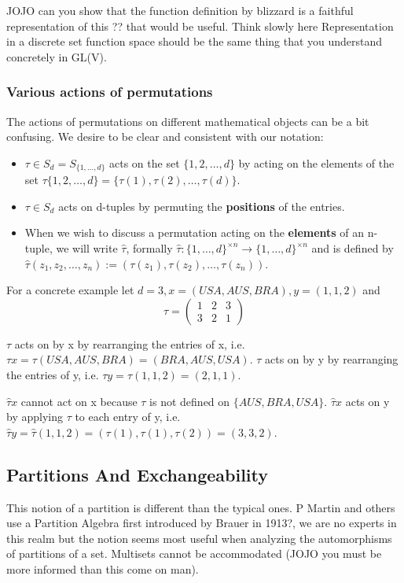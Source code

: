 \documentclass{article}
\theoremstyle{definition}
\begin{document}
JOJO can you show that the function definition by blizzard is a faithful representation of this ?? that would be useful. Think slowly here Representation in a discrete set function space should be the same thing that you understand concretely in GL(V).

\subsubsection{Various actions of permutations}
The actions of permutations on different mathematical objects can be a bit confusing. We desire to be clear and consistent with our notation:
\begin{itemize}
\item $\tau \in S_d= S_{\{1,\dots,d\}}$ acts on the set $\{1,2,\dots,d\}$ by acting on the elements of the set $\tau\{1,2,\dots,d\} = \{\tau(1),\tau(2),\dots,\tau(d)\}$.
\item $\tau\in S_d$ acts on d-tuples by permuting the \textbf{positions} of the entries.
\item When we wish to discuss a permutation acting on the \textbf{elements} of an n-tuple, we will write $\hat{\tau}$, formally $\hat{\tau}:\{1,\dots,d\}^{\times n} \rightarrow \{1,\dots,d\}^{\times n}$ and is defined by $\hat{\tau}(z_1,z_2,\dots,z_n) := (\tau(z_1),\tau(z_2),\dots,\tau(z_n))$.
\end{itemize}

For a concrete example let $d=3, x=(USA,AUS,BRA), y=(1,1,2)$ and 
$$\tau = \begin{pmatrix} 1 & 2 & 3\\ 3 & 2 & 1 \end{pmatrix}$$

$\tau$ acts on by x by rearranging the entries of x, i.e. $\tau x = \tau(USA,AUS,BRA) =(BRA,AUS,USA)$.
$\tau$ acts on by y by rearranging the entries of y, i.e. $\tau y = \tau(1,1,2) =(2,1,1)$.

$\hat{\tau}x$ cannot act on x because $\tau$ is not defined on $\{AUS,BRA,USA\}$.
$\hat{\tau}x$ acts on y by applying $\tau$ to each entry of y, i.e. $\hat{\tau}y = \hat{\tau}(1,1,2) =(\tau(1),\tau(1),\tau(2) ) =(3,3,2)$.

\subsection{Partitions And Exchangeability}
This notion of a partition is different than the typical ones. P Martin and others use a Partition Algebra first introduced by Brauer in 1913?, we are no experts in this realm but the notion seems most useful when analyzing the automorphisms of partitions of a set. Multisets cannot be accommodated (JOJO you must be more informed than this come on man).
\end{document}
